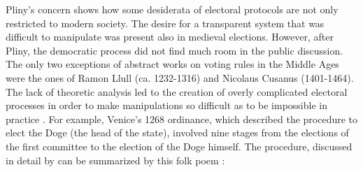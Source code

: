 Pliny's concern shows how some desiderata of electoral protocols are not only restricted to modern society. The desire for a transparent system that was difficult to manipulate was present also in medieval elections. However, after Pliny, the democratic process did not find much room in the public discussion. The only two exceptions of abstract works on voting rules in the Middle Ages were the ones of Ramon Llull (ca. 1232-1316) and Nicolaus Cusanus (1401-1464). The lack of theoretic analysis led to the creation of overly complicated electoral processes in order to make manipulations so difficult as to be impossible in practice \citep{Uckelman2010}. For example, Venice's 1268 ordinance, which described the procedure to elect the Doge (the head of the state), involved nine stages from the elections of the first committee to the election of the Doge himself. The procedure, discussed in detail by \citet{Lines1986, Coggins1998, Mowbray2007} can be summarized by this folk poem \citep{Doglioni1666}:
    
